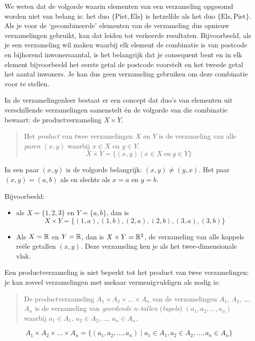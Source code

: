 We weten dat de volgorde waarin elementen van een verzameling opgesomd worden niet van belang is: het duo $\{\mathrm{Piet},\mathrm{Els} \}$ is hetzelfde als het duo $\{\mathrm{Els},\mathrm{Piet} \}$. Als je voor de `gecombineerde' elementen van de verzameling dus opnieuw verzamelingen gebruikt, kan dat leiden tot verkeerde resultaten. Bijvoorbeeld, als je een verzameling wil maken waarbij elk element de combinatie is van postcode en bijhorend inwonersaantal, is het belangrijk dat je consequent bent en in elk element bijvoorbeeld het eerste getal de postcode voorstelt en het tweede getal het aantal inwoners. Je kan dus geen verzameling gebruiken om deze combinatie voor te stellen.  \label{pg:postcodes}

In de verzamelingenleer bestaat er een concept dat duo's van elementen uit verschillende verzamelingen samenstelt \'en de volgorde van die combinatie bewaart: de  productverzameling $X \times Y$. 

\begin{quote}

Het \emph{product} van twee verzamelingen $X$ en $Y$ is de verzameling van alle \emph{paren} $(x,y)$ waarbij $x\in X$ en $y\in Y$.
\begin{equation*}
X\times Y=\{(x,y)\mid x\in X ~\mathrm{en}~y\in Y\}
\end{equation*}

\end{quote}

In een paar $(x,y)$ is de volgorde belangrijk: $(x,y)\not =(y,x)$. Het paar $(x,y)=(a,b)$ als en slechts als $x=a$ en $y=b$.

Bijvoorbeeld: 
\begin{itemize}
\item als $X=\{1,2,3\}$ en $Y=\{a,b\}$, dan is 
\begin{equation*}
X\times Y=\{(1,a),(1,b),(2,a),(2,b),(3,a),(3,b) \}
\end{equation*}
\item Als $X=\mathbb{R}$ en $Y=\mathbb{R}$, dan is 
$X \times Y=\mathbb{R}^2$, de verzameling van alle koppels 
re\"ele getallen $(x,y)$. Deze verzameling ken je als het twee-dimensionale vlak.
\end{itemize}


Een productverzameling is niet beperkt tot het product van twee verzamelingen: je kan zoveel verzamelingen met mekaar vermenigvuldigen als nodig is:
\begin{quote}
De  productverzameling $A_1\times A_2\times\dots\times A_n$ van de verzamelingen $A_1$, $A_2$, \dots, $A_n$ is de verzameling van \emph{geordende $n$-tallen} (\emph{tupels}) $(a_1,a_2,\dots,a_n)$ waarbij $a_1\in A_1$, $a_2\in  A_2$, \dots, $a_n \in A_n$.
\end{quote}
\begin{equation*}
A_1\times A_2\times\dots\times A_n=\{(a_1,a_2,\dots,a_n)\mid a_1\in A_1, a_2\in  A_2, \dots, a_n \in A_n\}
\end{equation*}

